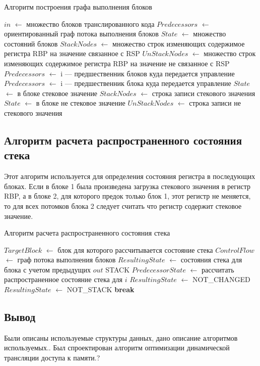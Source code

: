 \begin{algorithm}[H]
\small
	\caption{Алгоритм построения графа выполнения блоков}
	\label{alg:graph}
	\begin{algorithmic}[1]
		\State $in$ $\gets$ множество блоков транслированного кода
		\State $Predecessors$ $\gets$ ориентированный граф потока выполнения блоков
		\State $State$ $\gets$ множество состояний блоков
		\State $StackNodes$ $\gets$ множество строк изменяющих содержимое регистра RBP на значение связанное с RSP
		\State $UnStackNodes$ $\gets$ множество строк изменяющих содержимое регистра RBP на значение не связанное с RSP
		\State $Predecessors$ $\gets$ i --- предшественник блоков куда передается управление
		\EndIf
		\State $Predecessors$ $\gets$ i --- предшественник блока куда передается управление
		\EndIf
		\State $State$ $\gets$ в блоке стековое значение
		\State $StackNodes$ $\gets$ строка записи стекового значения
		\Else
		\State $State$ $\gets$ в блоке не стековое значение
		\State $UnStackNodes$ $\gets$ строка записи не стекового значения
		\EndIf
		\EndIf
		\EndFor
		\EndFor
	\end{algorithmic}
\end{algorithm}

\subsection{Алгоритм расчета распространенного состояния стека}

Этот алгоритм используется для определения состояния регистра в последующих блоках. Если в блоке 1 была произведена загрузка стекового значения в регистр RBP, а в блоке 2, для которого предок только блок 1, этот регистр не меняется, то для всех потомков блока 2 следует считать что регистр содержит стековое значение.

\begin{algorithm}[H]
\small
	\caption{Алгоритм расчета распространенного состояния стека}
	\label{alg:bilin}
	\begin{algorithmic}[1]
		\State $TargetBlock$ $\gets$ блок для которого рассчитывается состояние стека
		\State $ControlFlow$ $\gets$ граф потока выполнения блоков
		\State $ResultingState$ $\gets$ состояния стека для блока с учетом предыдущих
		\State $out$ STACK
		\State $PredecessorState$ $\gets$ рассчитать распространенное состояние стека для $i$
		\State $ResultingState$ $\gets$ NOT\_CHANGED
		\EndIf
		\State $ResultingState$ $\gets$ NOT\_STACK
		\State \textbf{break}
		\EndIf
		\EndFor
	\end{algorithmic}
\end{algorithm}

\subsection{Вывод}

Были описаны используемые структуры данных, дано описание алгоритмов используемых.. Был спроектирован алгоритм оптимизации динамической трансляции доступа к памяти.?

\pagebreak